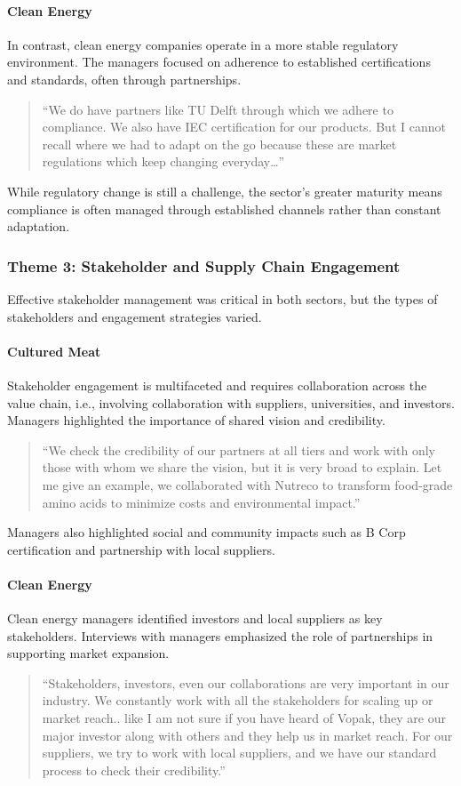 \paragraph{Clean Energy}
In contrast, clean energy companies operate in a more stable regulatory environment. The managers focused on adherence to established certifications and standards, often through partnerships.
\begin{quote}
	“We do have partners like TU Delft through which we adhere to compliance. We also have IEC certification for our products. But I cannot recall where we had to adapt on the go because these are market regulations which keep changing everyday…”
\end{quote}
While regulatory change is still a challenge, the sector’s greater maturity means compliance is often managed through established channels rather than constant adaptation.

\subsubsection*{Theme 3: Stakeholder and Supply Chain Engagement}
Effective stakeholder management was critical in both sectors, but the types of stakeholders and engagement strategies varied.

\paragraph{Cultured Meat}
Stakeholder engagement is multifaceted and requires collaboration across the value chain, i.e., involving collaboration with suppliers, universities, and investors. Managers highlighted the importance of shared vision and credibility.
\begin{quote}
	“We check the credibility of our partners at all tiers and work with only those with whom we share the vision, but it is very broad to explain. Let me give an example, we collaborated with Nutreco to transform food-grade amino acids to minimize costs and environmental impact.”
\end{quote}
Managers also highlighted social and community impacts such as B Corp certification and partnership with local suppliers.

\paragraph{Clean Energy}
Clean energy managers identified investors and local suppliers as key stakeholders. Interviews with managers emphasized the role of partnerships in supporting market expansion.
\begin{quote}
	“Stakeholders, investors, even our collaborations are very important in our industry. We constantly work with all the stakeholders for scaling up or market reach.. like I am not sure if you have heard of Vopak, they are our major investor along with others and they help us in market reach. For our suppliers, we try to work with local suppliers, and we have our standard process to check their credibility.”
\end{quote}

